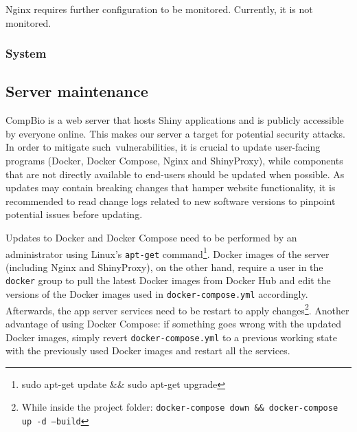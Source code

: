 Nginx requires further configuration to be monitored. Currently, it is not monitored.

\subsubsection{System}

\subsection{Server maintenance}


CompBio is a web server that hosts Shiny applications and is publicly accessible by everyone online. This makes our server a target for potential security attacks. In order to mitigate such vulnerabilities, it is crucial to update user-facing programs (Docker, Docker Compose, Nginx and ShinyProxy), while components that are not directly available to end-users should be updated when possible. As updates may contain breaking changes that hamper website functionality, it is recommended to read change logs related to new software versions to pinpoint potential issues before updating.


Updates to Docker and Docker Compose need to be performed by an administrator using Linux's \texttt{apt-get} command\footnote{sudo apt-get update \&\& sudo apt-get upgrade}. Docker images of the server (including Nginx and ShinyProxy), on the other hand, require a user in the \texttt{docker} group to pull the latest Docker images from Docker Hub and edit the versions of the Docker images used in \texttt{docker-compose.yml} accordingly. Afterwards, the app server services need to be restart to apply changes\footnote{While inside the project folder: \texttt{docker-compose down \&\& docker-compose up -d --build}}. Another advantage of using Docker Compose: if something goes wrong with the updated Docker images, simply revert \texttt{docker-compose.yml} to a previous working state with the previously used Docker images and restart all the services.


